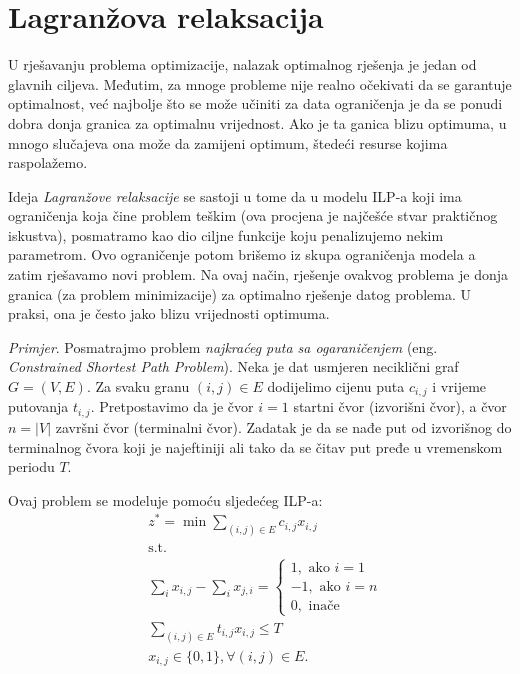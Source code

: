 \documentclass[a4paper, utf8, 11pt, colorlinks]{book}
\begin{document}
\section{Lagranžova relaksacija}
U rješavanju problema optimizacije, nalazak optimalnog rješenja je jedan od glavnih ciljeva. Međutim, za mnoge probleme nije realno očekivati da se garantuje optimalnost, već najbolje što se može učiniti za data ograničenja  je da se ponudi dobra donja granica za optimalnu vrijednost. Ako je ta ganica blizu optimuma, u mnogo slučajeva ona može da zamijeni optimum, štedeći resurse kojima raspolažemo. 

Ideja \emph{Lagranžove relaksacije} se sastoji u tome da u modelu ILP-a  koji ima  ograničenja koja čine problem teškim (ova procjena je najčešće stvar praktičnog iskustva),  posmatramo kao dio ciljne funkcije koju penalizujemo nekim parametrom.  %
Ovo ograničenje potom brišemo iz skupa ograničenja modela a zatim rješavamo novi problem. Na ovaj način, rješenje ovakvog problema je donja granica (za problem minimizacije) za optimalno rješenje datog problema. U praksi, ona je često jako blizu vrijednosti optimuma. 

\emph{Primjer}. Posmatrajmo problem \emph{najkraćeg puta sa ogaraničenjem} (eng. \emph{Constrained Shortest Path Problem}). Neka je dat usmjeren neciklični graf $G=(V,E)$. Za svaku granu $(i,j) \in E$ dodijelimo cijenu puta $c_{i,j}$ i vrijeme putovanja $t_{i,j}$. Pretpostavimo da je čvor $i=1$ startni čvor (izvorišni čvor), a čvor $n = |V|$   završni čvor (terminalni čvor). Zadatak je da se nađe put  od izvorišnog do terminalnog čvora koji je najeftiniji ali tako da se čitav put pređe u vremenskom periodu $T$.

Ovaj problem se modeluje pomoću sljedećeg ILP-a:
 \begin{align}
    &z^*=\min\sum_{(i,j) \in E }c_{i,j}x_{i,j} \\
    &\mbox{s.t. }\\
    & \sum_{i} x_{i,j} - \sum_{i} x_{j,i} = \begin{cases}  
                                               1, \mbox{ ako } i=1 \\
                                              -1, \mbox{ ako } i=n \\
                                               0, \mbox{ inače }
                                            \end{cases} \\
    & \sum_{(i,j) \in E} t_{i,j} x_{i,j} \leq T \\
    & x_{i,j} \in \{0, 1 \}, \forall (i,j) \in E.
\end{align} 
\end{document}
